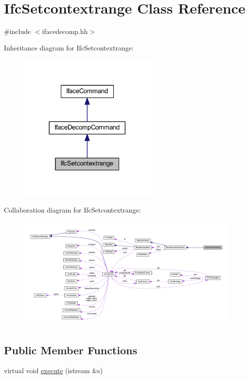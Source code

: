 \hypertarget{class_ifc_setcontextrange}{}\section{Ifc\+Setcontextrange Class Reference}
\label{class_ifc_setcontextrange}


{\ttfamily \#include $<$ifacedecomp.\+hh$>$}



Inheritance diagram for Ifc\+Setcontextrange\+:
\nopagebreak
\begin{figure}[H]
\begin{center}
\leavevmode
\includegraphics[width=197pt]{class_ifc_setcontextrange__inherit__graph}
\end{center}
\end{figure}


Collaboration diagram for Ifc\+Setcontextrange\+:
\nopagebreak
\begin{figure}[H]
\begin{center}
\leavevmode
\includegraphics[width=350pt]{class_ifc_setcontextrange__coll__graph}
\end{center}
\end{figure}
\subsection*{Public Member Functions}
\begin{DoxyCompactItemize}
\item 
virtual void \mbox{\hyperlink{class_ifc_setcontextrange_aa24fec02de28b15d6e7a85d25567f52c}{execute}} (istream \&s)
\end{DoxyCompactItemize}
